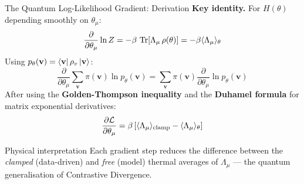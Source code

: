 \documentclass[aspectratio=169,10pt]{beamer}
\begin{document}
\begin{frame}{The Quantum Log-Likelihood Gradient: Derivation}
  \textbf{Key identity.} For $H(\theta)$ depending smoothly on $\theta_\mu$:
  \[
    \frac{\partial}{\partial\theta_\mu}\ln Z
    = -\beta\,\Tr\!\left[\Lambda_\mu\,\rho(\theta)\right]
    = -\beta\langle\Lambda_\mu\rangle_\theta
  \]
  Using $p_\theta(\mathbf{v}) = \bra{\mathbf{v}}\rho_v\ket{\mathbf{v}}$:
  \[
    \frac{\partial}{\partial\theta_\mu}
    \sum_\mathbf{v}\pi(\mathbf{v})\ln p_\theta(\mathbf{v})
    = \sum_\mathbf{v}\pi(\mathbf{v})
      \frac{\partial}{\partial\theta_\mu}\ln p_\theta(\mathbf{v})
  \]
  After using the \textbf{Golden-Thompson inequality} and the
  \textbf{Duhamel formula} for matrix exponential derivatives:
  \[
    \frac{\partial \mathcal{L}}{\partial\theta_\mu}
    = \beta\left[
        \langle\Lambda_\mu\rangle_{\rm clamp}
        - \langle\Lambda_\mu\rangle_\theta
      \right]
  \]
  \begin{alertblock}{Physical interpretation}
    Each gradient step reduces the difference between the
    \emph{clamped} (data-driven) and \emph{free} (model)
    thermal averages of $\Lambda_\mu$ — the quantum
    generalisation of Contrastive Divergence.
  \end{alertblock}
\end{frame}
\end{document}
